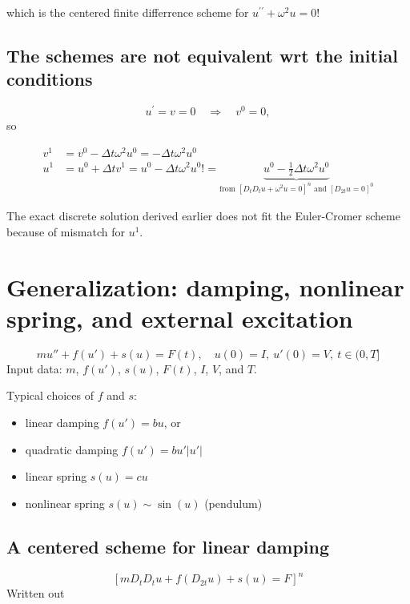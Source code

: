 \documentclass[%
oneside,                 %
final,                   %
10pt]{article}
\begin{document}
which is the centered finite differrence scheme for $u^{\prime\prime}+\omega^2u=0$!

\subsection*{The schemes are not equivalent wrt the initial conditions}

\[ u^{\prime}=v=0\quad\Rightarrow\quad v^0=0,\]
so

\begin{align*}
v^1 &= v^0 - \Delta t\omega^2 u^0 = - \Delta t\omega^2 u^0\\ 
u^1 &= u^0 + \Delta t v^1 = u^0 - \Delta t\omega^2 u^0 !=
\underbrace{u^0 - \frac{1}{2}\Delta t\omega^2 u^0}_{\mbox{from }[D_tD_t u +\omega^2 u=0]^n\mbox{ and }[D_{2t}u=0]^0}
\end{align*}

The exact discrete solution derived earlier does not fit the Euler-Cromer
scheme because of mismatch for $u^1$.

\section*{Generalization: damping, nonlinear spring, and external excitation}
\label{vib:model2}

\[
mu'' + f(u') + s(u) = F(t),\quad u(0)=I,\ u'(0)=V,\ t\in (0,T]
\]
Input data: $m$, $f(u')$, $s(u)$, $F(t)$, $I$, $V$, and $T$.

Typical choices of $f$ and $s$:

\begin{itemize}
 \item linear damping $f(u')=bu$, or

 \item quadratic damping $f(u')=bu'|u'|$

 \item linear spring $s(u)=cu$

 \item nonlinear spring $s(u)\sim \sin(u)$ (pendulum)
\end{itemize}

\noindent
\subsection*{A centered scheme for linear damping}
\label{vib:ode2:fdm:flin}

\[
[mD_tD_t u + f(D_{2t}u) + s(u) = F]^n
\]
Written out
\end{document}
